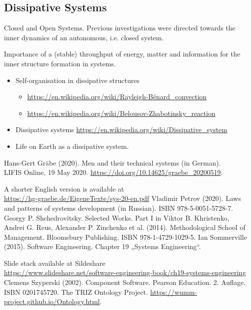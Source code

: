 \documentclass[11pt,a4paper]{article}
\begin{document}
\subsection{Dissipative Systems}


Closed and Open Systems. Previous investigations were directed towards the
inner dynamics of an autonomous, i.e. closed system.

Importance of a (stable) throughput of energy, matter and information for the
inner structure formation in systems.

\begin{itemize}
\item Self-organisation in dissipative structures
  \begin{itemize}
  \item \url{https://en.wikipedia.org/wiki/Rayleigh-Bénard_convection}
  \item \url{https://en.wikipedia.org/wiki/Belousov-Zhabotinsky_reaction}
  \end{itemize}
\item Dissipative systems
  \url{https://en.wikipedia.org/wiki/Dissipative_system} 
\item Life on Earth as a dissipative system.
\end{itemize}

\begin{thebibliography}{xxx}
 Hans-Gert Gräbe (2020). Men and their technical systems
  (in German).\\ LIFIS Online, 19 May 2020.
  \url{https://doi.org/10.14625/graebe_20200519}.

  A shorter English version is available at\\
  \url{https://hg-graebe.de/EigeneTexte/sys-20-en.pdf}
 Vladimir Petrov (2020). Laws and patterns of systems
  development (in Russian). ISBN 978-5-0051-5728-7.
 Georgy P. Shchedrovitsky. Selected Works. Part I in Viktor
  B. Khristenko, Andrei G. Reus, Alexander P. Zinchenko et al. (2014).
  Methodological School of Management. Bloomsbury Publishing.  ISBN
  978-1-4729-1029-5.
 Ian Sommerville (2015). Software Engineering.
  Chapter 19 „Systems Engineering“.

  Slide stack available at Sildeshare\\{\small
  \url{https://www.slideshare.net/software-engineering-book/ch19-systems-engineering}}
 Clemens Szyperski (2002). Component Software. Pearson
  Education.  2. Auf\-lage.  ISBN 0201745720.
 The TRIZ Ontology Project.
  \url{https://wumm-project.github.io/Ontology.html}.
\end{thebibliography}
\end{document}
